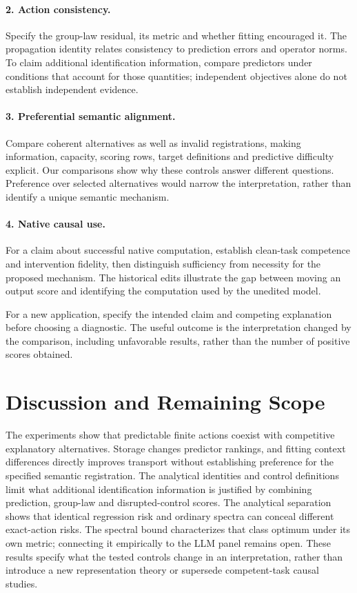 \documentclass{article}
\begin{document}
\paragraph{2. Action consistency.}
Specify the group-law residual, its metric and whether fitting encouraged it. The propagation identity relates consistency to prediction errors and operator norms. To claim additional identification information, compare predictors under conditions that account for those quantities; independent objectives alone do not establish independent evidence.

\paragraph{3. Preferential semantic alignment.}
Compare coherent alternatives as well as invalid registrations, making information, capacity, scoring rows, target definitions and predictive difficulty explicit. Our comparisons show why these controls answer different questions. Preference over selected alternatives would narrow the interpretation, rather than identify a unique semantic mechanism.

\paragraph{4. Native causal use.}
For a claim about successful native computation, establish clean-task competence and intervention fidelity, then distinguish sufficiency from necessity for the proposed mechanism. The historical edits illustrate the gap between moving an output score and identifying the computation used by the unedited model.

For a new application, specify the intended claim and competing explanation before choosing a diagnostic. The useful outcome is the interpretation changed by the comparison, including unfavorable results, rather than the number of positive scores obtained.

\section{Discussion and Remaining Scope}
The experiments show that predictable finite actions coexist with competitive explanatory alternatives. Storage changes predictor rankings, and fitting context differences directly improves transport without establishing preference for the specified semantic registration. The analytical identities and control definitions limit what additional identification information is justified by combining prediction, group-law and disrupted-control scores. The analytical separation shows that identical regression risk and ordinary spectra can conceal different exact-action risks. The spectral bound characterizes that class optimum under its own metric; connecting it empirically to the LLM panel remains open. These results specify what the tested controls change in an interpretation, rather than introduce a new representation theory or supersede competent-task causal studies.
\end{document}

